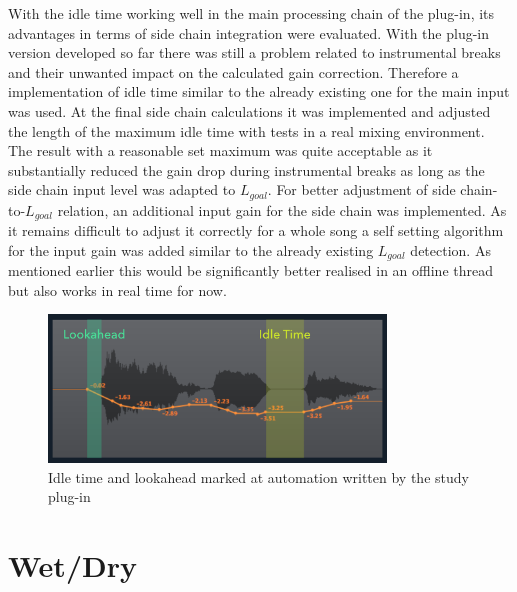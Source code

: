 With the idle time working well in the main processing chain of the plug-in, its advantages in terms of side chain integration were evaluated. With the plug-in version developed so far there was still a problem related to instrumental breaks and their unwanted impact on the calculated gain correction. Therefore a implementation of idle time similar to the already existing one for the main input was used. At the final side chain calculations it was implemented and adjusted the length of the maximum idle time with tests in a real mixing environment. The result with a reasonable set maximum was quite acceptable as it substantially reduced the gain drop during instrumental breaks as long as the side chain input level was adapted to $L_{goal}$. For better adjustment of side chain-to-$L_{goal}$ relation, an additional input gain for the side chain was implemented. As it remains difficult to adjust it correctly for a whole song a self setting algorithm for the input gain was added similar to the already existing $L_{goal}$ detection. As mentioned earlier this would be significantly better realised in an offline thread but also works in real time for now.\\

\begin{figure}
\includegraphics[width=0.8\textwidth]{images/automation2LookIdle}
	\centering
	\caption{Idle time and lookahead marked at automation written by the study plug-in}
	\label{auto2look}
\end{figure}

\section{Wet/Dry}

